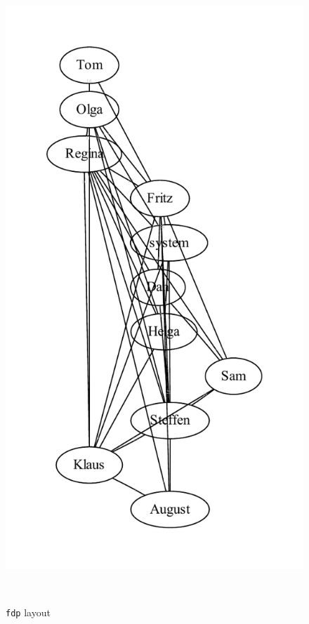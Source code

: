 \documentclass[a4paper]{scrartcl}
\newcommand{\code}[1]{\texttt{\color{code}#1}}
\begin{document}
\begin{figure}
{  \includegraphics[width=\linewidth]{gv_ca-fdp}
  \caption{\code{fdp} layout}
  \label{fig:gv-cafdp}}\\
\parbox[b]{0.7\textwidth}{\centering
}
\end{figure}
\end{document}
